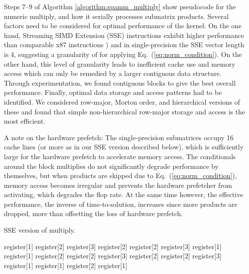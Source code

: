 Steps 7--9 of Algorithm \ref{algorithm:spamm_multiply} show pseudocode for the
numeric multiply, and how it serially processes submatrix products.  Several
factors need to be considered for optimal performance of the kernel: On the
one hand, Streaming SIMD Extension (SSE) instructions exhibit higher
performance than comparable x87 instructions \cite[Sec.~3.8.4]{Intel2009}) and
in single-precision the SSE vector length is 4, suggesting a granularity of  for applying Eq.~(\ref{eq:norm_condition}).  On the other hand, this
 level of granularity leads to inefficient cache use and memory
access which can only be remedied by a larger contiguous data structure.
Through experimentation, we found  contiguous blocks to give the
best overall performance. Finally, optimal data storage and access patterns
had to be identified. We considered row-major, Morton order, and hierarchical
versions of these and found that simple non-hierarchical row-major storage and
access is the most efficient.

A note on the hardware prefetch: The  single-precision
submatrices occupy 16 cache lines (or more as in our SSE version described
below), which is sufficiently large for the hardware prefetch to accelerate
memory access. The conditionals around the  block multiplies do not
significantly degrade performance by themselves, but when products are skipped
due to Eq.~(\ref{eq:norm_condition}), memory access becomes irregular and
prevents the hardware prefetcher from activating, which degrades the flop rate.
At the same time however, the effective performance, the inverse of
time-to-solution, increases since more products are dropped, more than
offsetting the loss of hardware prefetch.

\begin{algorithm}
\caption{\label{algorithm:SSE_version} SSE version of  multiply.}
\begin{algorithmic}[1]
\STATE register[1] 
\STATE register[2] 
\STATE register[3] 
\STATE register[2]  register[2]  register[3]
\STATE register[1]  register[1]  register[2]
\STATE register[2] 
\STATE register[3] 
\STATE register[2]  register[2]  register[3]
\STATE register[1]  register[1]  register[2]
\STATE register[1] 
\end{algorithmic}
\end{algorithm}

